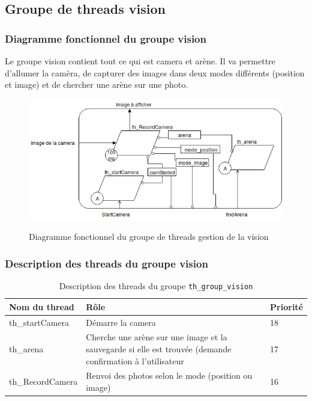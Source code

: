 \documentclass[11pt, a4paper]{paper}
\begin{document}
\subsection{Groupe de threads vision}

\subsubsection{Diagramme fonctionnel du groupe vision}

{Le groupe vision contient tout ce qui est camera et arène. Il va permettre d'allumer la camèra, de capturer des images dans deux modes différents (position et image) et de chercher une arène sur une photo.}

\begin{figure}[htp]
\label{fig:act_communiquer}
\begin{center}
{\includegraphics[scale=.4]{./dossier_conception/diag_fonc_vision.png}}
{\caption{Diagramme fonctionnel du groupe de threads gestion de la vision}}
\end{center}
\end{figure}

\subsubsection{Description des threads du groupe vision}

\begin{table}[htp]
\caption{Description des threads du groupe {\tt th\_group\_vision}}
\begin{center}
\begin{tabular}{|p{3cm}|p{8.5cm}|p{2cm}|}
\hline
\bf Nom du thread &	\bf Rôle &	\bf Priorité \\
\hline
\hline
\color{blue}th\_startCamera &	\color{blue}Démarre la camera &	\color{blue}18\\
\hline
\color{blue}th\_arena &	\color{blue}Cherche une arène sur une image et la sauvegarde si elle est trouvée (demande confirmation à l'utilisateur &	\color{blue}17\\
\hline
\color{blue}th\_RecordCamera &	\color{blue}Renvoi des photos selon le mode (position ou image) &	\color{blue}16\\
\hline
\end{tabular}
\end{center}
\label{tab:gt_moniteur}
\end{table}%
\FloatBarrier
\end{document}
